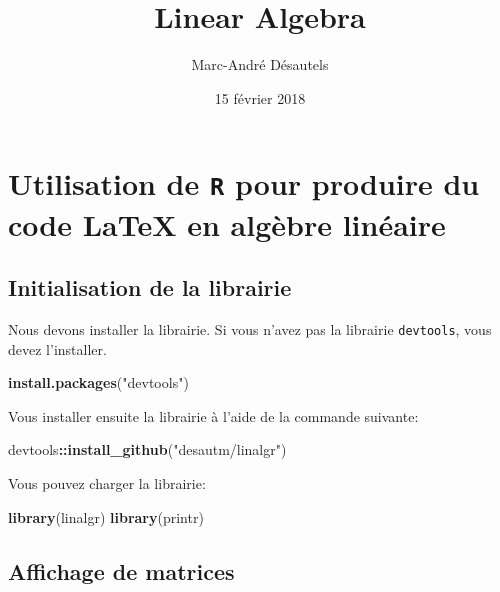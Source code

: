 \documentclass[]{article}
\title{Linear Algebra}
\author{Marc-André Désautels}
\date{15 février 2018}
\newenvironment{Shaded}{\begin{snugshade}}{\end{snugshade}}
\newcommand{\KeywordTok}[1]{\textcolor[rgb]{0.13,0.29,0.53}{\textbf{#1}}}
\newcommand{\StringTok}[1]{\textcolor[rgb]{0.31,0.60,0.02}{#1}}
\newcommand{\OperatorTok}[1]{\textcolor[rgb]{0.81,0.36,0.00}{\textbf{#1}}}
\newcommand{\NormalTok}[1]{#1}
\begin{document}
\maketitle

\section{\texorpdfstring{Utilisation de \texttt{R} pour produire du code
LaTeX en algèbre
linéaire}{Utilisation de R pour produire du code LaTeX en algèbre linéaire}}\label{utilisation-de-r-pour-produire-du-code-latex-en-algebre-lineaire}

\subsection{Initialisation de la
librairie}\label{initialisation-de-la-librairie}

Nous devons installer la librairie. Si vous n'avez pas la librairie
\texttt{devtools}, vous devez l'installer.

\begin{Shaded}
\begin{Highlighting}[]
\KeywordTok{install.packages}\NormalTok{(}\StringTok{"devtools"}\NormalTok{)}
\end{Highlighting}
\end{Shaded}

Vous installer ensuite la librairie à l'aide de la commande suivante:

\begin{Shaded}
\begin{Highlighting}[]
\NormalTok{devtools}\OperatorTok{::}\KeywordTok{install_github}\NormalTok{(}\StringTok{"desautm/linalgr"}\NormalTok{)}
\end{Highlighting}
\end{Shaded}

Vous pouvez charger la librairie:

\begin{Shaded}
\begin{Highlighting}[]
\KeywordTok{library}\NormalTok{(linalgr)}
\KeywordTok{library}\NormalTok{(printr)}
\end{Highlighting}
\end{Shaded}

\subsection{Affichage de matrices}\label{affichage-de-matrices}
\end{document}
